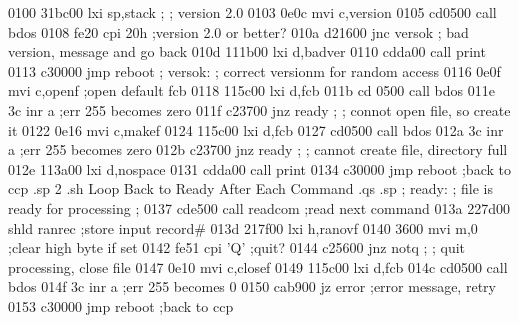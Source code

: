 0100 31bc00                       lxi    sp,stack
                         ;
                         ;        version 2.0
0103 0e0c                         mvi    c,version
0105 cd0500                       call   bdos
0108 fe20                         cpi    20h       ;version 2.0 or better?
010a d21600                       jnc    versok
                         ;        bad version, message and go back
010d 111b00                       lxi    d,badver
0110 cdda00                       call   print
0113 c30000                       jmp    reboot
                         ;
                         versok:
                         ;        correct versionm for random access
0116 0e0f                         mvi    c,openf   ;open default fcb
0118 115c00                       lxi    d,fcb 
011b cd 0500                      call   bdos
011e 3c                           inr    a         ;err 255 becomes zero
011f c23700                       jnz    ready
                         ;
                         ;        connot open file, so create it
0122 0e16                         mvi    c,makef
0124 115c00                       lxi    d,fcb
0127 cd0500                       call   bdos
012a 3c                           inr    a         ;err 255 becomes zero
012b c23700                       jnz    ready
                         ;
                         ;        cannot create file, directory full
012e 113a00                       lxi    d,nospace
0131 cdda00                       call   print
0134 c30000                       jmp    reboot    ;back to ccp
.sp 2
.sh
                          Loop Back to Ready After Each Command
.qs
.sp
                         ;
                         ready:
                         ;        file is ready for processing
                         ;
0137 cde500                       call   readcom   ;read next command
013a 227d00                       shld   ranrec    ;store input record#
013d 217f00                       lxi    h,ranovf
0140 3600                         mvi    m,0       ;clear high byte if set
0142 fe51                         cpi    'Q'       ;quit?
0144 c25600                       jnz    notq      
                         ;
                         ;        quit processing, close file
0147 0e10                         mvi    c,closef
0149 115c00                       lxi    d,fcb
014c cd0500                       call   bdos
014f 3c                           inr    a         ;err 255 becomes 0
0150 cab900                       jz     error     ;error message, retry
0153 c30000                       jmp    reboot    ;back to ccp
